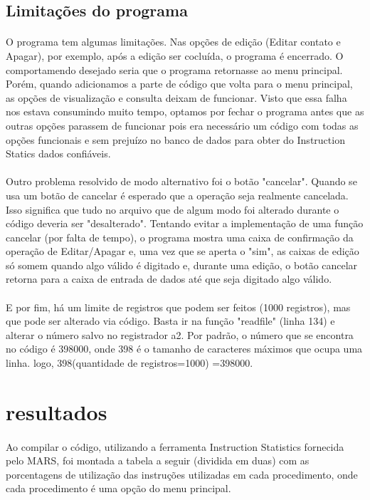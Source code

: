 \documentclass[12pt]{article}
\begin{document}
\subsection{Limitações do programa}
    \paragraph{}
    O programa tem algumas limitações. Nas opções de edição (Editar contato e Apagar), por exemplo, após a edição ser cocluída, o programa é encerrado. O comportamendo desejado seria que o programa retornasse ao menu principal. Porém, quando adicionamos a parte de código que volta para o menu principal, as opções de visualização e consulta deixam de funcionar. Visto que essa falha nos estava consumindo muito tempo, optamos por fechar o programa antes que as outras opções parassem de funcionar pois era necessário um código com todas as opções funcionais e sem prejuízo no banco de dados para obter do Instruction Statics dados confiáveis.
    \paragraph{}
    Outro problema resolvido de modo alternativo foi o botão "cancelar". Quando se usa um botão de cancelar é esperado que a operação seja realmente cancelada. Isso significa que tudo no arquivo que de algum modo foi alterado durante o código deveria ser "desalterado". Tentando evitar a implementação de uma função cancelar (por falta de tempo), o programa mostra uma caixa de confirmação da operação de Editar/Apagar e, uma vez que se aperta o "sim", as caixas de edição só somem quando algo válido é digitado e, durante uma edição, o botão cancelar retorna para a caixa de entrada de dados até que seja digitado algo válido.
    \paragraph{}
    E por fim, há um limite de registros que podem ser feitos (1000 registros), mas que pode ser alterado via código. Basta ir na função "readfile" (linha 134) e alterar o número salvo no registrador a2. Por padrão, o número que se encontra no código é 398000, onde 398 é o tamanho de caracteres máximos que ocupa uma linha. logo, 398(quantidade de registros=1000) =398000.
\section{resultados}
    \paragraph{}
    Ao compilar o código, utilizando a ferramenta Instruction Statistics fornecida pelo MARS, foi montada a tabela a seguir (dividida em duas) com as porcentagens de utilização das instruções utilizadas em cada procedimento, onde cada procedimento é uma opção do menu principal.
\end{document}

